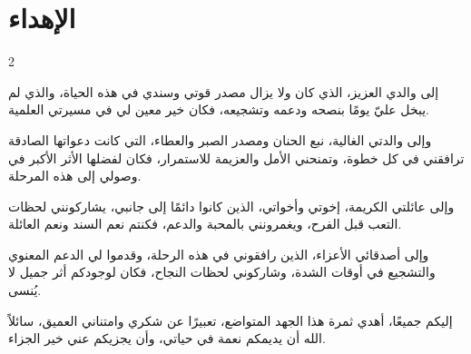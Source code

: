 \chapter*{الإهداء}
\begin{spacing}{2}
	\begin{center}
		\amirifont
	إلى والدي العزيز، الذي كان ولا يزال مصدر قوتي وسندي في هذه الحياة، والذي لم يبخل عليّ يومًا بنصحه ودعمه وتشجيعه، فكان خير معين لي في مسيرتي العلمية.
	
	وإلى والدتي الغالية، نبع الحنان ومصدر الصبر والعطاء، التي كانت دعواتها الصادقة ترافقني في كل خطوة، وتمنحني الأمل والعزيمة للاستمرار، فكان لفضلها الأثر الأكبر في وصولي إلى هذه المرحلة.
	
	وإلى عائلتي الكريمة، إخوتي وأخواتي، الذين كانوا دائمًا إلى جانبي، يشاركونني لحظات التعب قبل الفرح، ويغمرونني بالمحبة والدعم، فكنتم نعم السند ونعم العائلة.
	
	وإلى أصدقائي الأعزاء، الذين رافقوني في هذه الرحلة، وقدموا لي الدعم المعنوي والتشجيع في أوقات الشدة، وشاركوني لحظات النجاح، فكان لوجودكم أثر جميل لا يُنسى.
	
	إليكم جميعًا، أهدي ثمرة هذا الجهد المتواضع، تعبيرًا عن شكري وامتناني العميق، سائلاً الله أن يديمكم نعمة في حياتي، وأن يجزيكم عني خير الجزاء.
\end{center}
\end{spacing}
